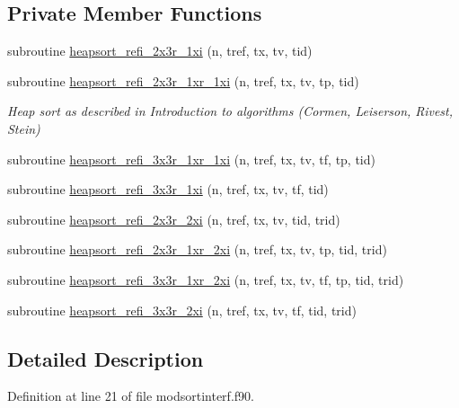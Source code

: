 \subsection*{Private Member Functions}
\begin{DoxyCompactItemize}
\item 
subroutine \hyperlink{interfacemodsortinterf_1_1heapsort_a5cbbb5add647e60a3338d4d5aa5bc0c4}{heapsort\+\_\+refi\+\_\+2x3r\+\_\+1xi} (n, tref, tx, tv, tid)
\item 
subroutine \hyperlink{interfacemodsortinterf_1_1heapsort_acf802a187b3156217c5189914fc3c5dc}{heapsort\+\_\+refi\+\_\+2x3r\+\_\+1xr\+\_\+1xi} (n, tref, tx, tv, tp, tid)
\begin{DoxyCompactList}\small\item\em Heap sort as described in Introduction to algorithms (Cormen, Leiserson, Rivest, Stein) \end{DoxyCompactList}\item 
subroutine \hyperlink{interfacemodsortinterf_1_1heapsort_a1b0496cffffd026ecd963c6c940f74c1}{heapsort\+\_\+refi\+\_\+3x3r\+\_\+1xr\+\_\+1xi} (n, tref, tx, tv, tf, tp, tid)
\item 
subroutine \hyperlink{interfacemodsortinterf_1_1heapsort_a0ba1556a756726e4b7f9339970f089b1}{heapsort\+\_\+refi\+\_\+3x3r\+\_\+1xi} (n, tref, tx, tv, tf, tid)
\item 
subroutine \hyperlink{interfacemodsortinterf_1_1heapsort_a2660aea691c9178df3aa11af9a6cc8f3}{heapsort\+\_\+refi\+\_\+2x3r\+\_\+2xi} (n, tref, tx, tv, tid, trid)
\item 
subroutine \hyperlink{interfacemodsortinterf_1_1heapsort_a495a6f6342a96d0bc2c5fcb731f0dd2f}{heapsort\+\_\+refi\+\_\+2x3r\+\_\+1xr\+\_\+2xi} (n, tref, tx, tv, tp, tid, trid)
\item 
subroutine \hyperlink{interfacemodsortinterf_1_1heapsort_a002758c8edf00e36596148059c845a3b}{heapsort\+\_\+refi\+\_\+3x3r\+\_\+1xr\+\_\+2xi} (n, tref, tx, tv, tf, tp, tid, trid)
\item 
subroutine \hyperlink{interfacemodsortinterf_1_1heapsort_a10a0ffdd549dc88c7787c43899c321b0}{heapsort\+\_\+refi\+\_\+3x3r\+\_\+2xi} (n, tref, tx, tv, tf, tid, trid)
\end{DoxyCompactItemize}


\subsection{Detailed Description}


Definition at line 21 of file modsortinterf.\+f90.



